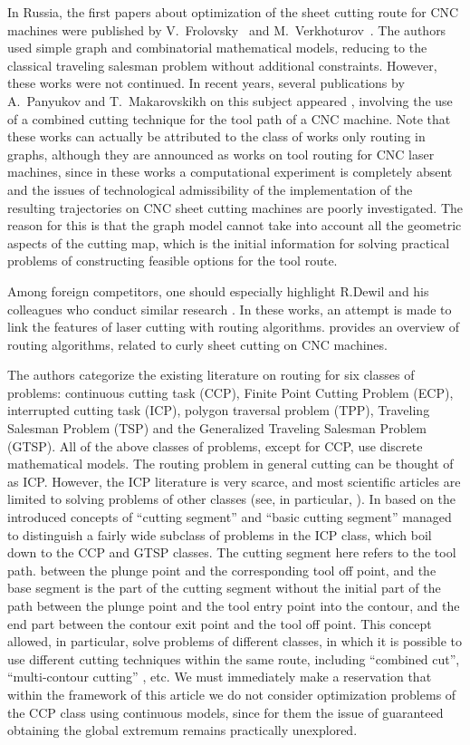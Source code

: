 \documentclass[numbers,sort&compress]{IntechOpen-Book}%
\begin{document}
In Russia,
the first papers about optimization of the sheet cutting route for CNC machines
were published by V.~Frolovsky~\cite{bibx:104}
and M.~Verkhoturov~\cite{bibx:105}.
The authors used simple graph and combinatorial mathematical models,
reducing to the classical traveling salesman problem without additional constraints.
However, these works were not continued.
In recent years,
several publications by A.~Panyukov
and T.~Makarovskikh on this subject
appeared
\cite{bibx:106,bibx:107,bibx:108},
involving the use of a combined cutting technique
for the tool path of a CNC machine.
Note that these works can actually be attributed to the class of works
only routing in graphs,
although they are announced as works on tool routing for CNC laser machines,
since in these works a computational experiment is completely absent
and the issues of technological admissibility of the implementation of the resulting trajectories on CNC sheet cutting machines are poorly investigated.
The reason for this is that the graph model
cannot take into account all the geometric aspects of the cutting map,
which is the initial information for solving practical problems of constructing feasible options for the tool route.

Among foreign competitors, one should especially highlight R.Dewil and his colleagues who conduct similar research \cite{bibx:100,bibx:109,bibx:110}.
In these works, an attempt is made to link the features of laser cutting with routing algorithms.
\cite{bibx:109} provides an overview of routing algorithms,
related to curly sheet cutting on CNC machines.

The authors categorize the existing literature on routing
for six classes of problems:
continuous cutting task (CCP),
Finite Point Cutting Problem (ECP),
interrupted cutting task (ICP),
polygon traversal problem (TPP),
Traveling Salesman Problem (TSP)
and the Generalized Traveling Salesman Problem (GTSP).
All of the above classes of problems, except for CCP, use discrete mathematical models.
The routing problem in general cutting can be thought of as ICP.
However, the ICP literature is very scarce,
and most scientific articles are limited to solving problems of other classes (see, in particular, \cite{bibx:301}).
In \cite{bibx:112}
based on the introduced concepts of ``cutting segment''
and ``basic cutting segment''
managed to distinguish a fairly wide subclass of problems in the ICP class,
which boil down to the CCP and GTSP classes.
The cutting segment here refers to the tool path.
between the plunge point and the corresponding tool off point, and the base segment is the part of the cutting segment without the initial part of the path between the plunge point and the tool entry point into the contour,
and the end part between the contour exit point and the tool off point.
This concept allowed, in particular,
solve problems of different classes,
in which it is possible to use different cutting techniques within the same route,
including ``combined cut'', ``multi-contour cutting''
\cite[part I] {4}, etc.
We must immediately make a reservation that within the framework of this article we do not consider optimization problems of the CCP class using continuous models,
since for them the issue of guaranteed obtaining the global extremum remains practically unexplored.
\end{document}
